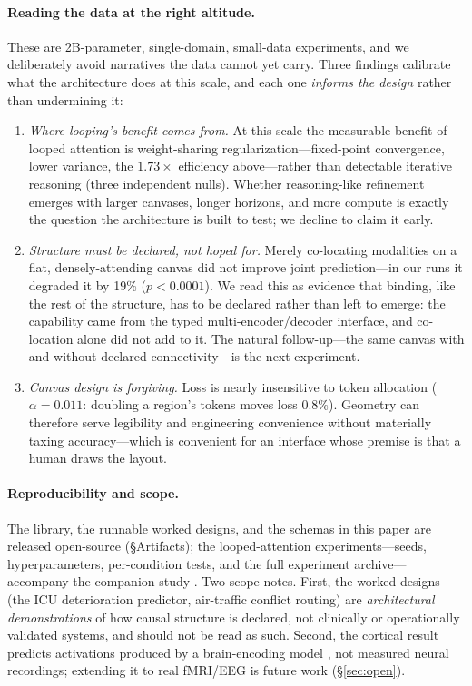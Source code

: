 \documentclass[10pt,twocolumn]{article}
\begin{document}
\paragraph{Reading the data at the right altitude.} These are 2B-parameter, single-domain, small-data experiments, and we deliberately avoid narratives the data cannot yet carry. Three findings calibrate what the architecture does at this scale, and each one \emph{informs the design} rather than undermining it:
\begin{enumerate}[leftmargin=1.2em,itemsep=1pt,topsep=2pt]
\item \emph{Where looping's benefit comes from.} At this scale the measurable benefit of looped attention is weight-sharing regularization---fixed-point convergence, lower variance, the $1.73\times$ efficiency above---rather than detectable iterative reasoning (three independent nulls). Whether reasoning-like refinement emerges with larger canvases, longer horizons, and more compute is exactly the question the architecture is built to test; we decline to claim it early.
\item \emph{Structure must be declared, not hoped for.} Merely co-locating modalities on a flat, densely-attending canvas did not improve joint prediction---in our runs it degraded it by 19\% ($p<0.0001$). We read this as evidence that binding, like the rest of the structure, has to be declared rather than left to emerge: the capability came from the typed multi-encoder/decoder interface, and co-location alone did not add to it. The natural follow-up---the same canvas with and without declared connectivity---is the next experiment.
\item \emph{Canvas design is forgiving.} Loss is nearly insensitive to token allocation ($\alpha=0.011$: doubling a region's tokens moves loss $0.8\%$). Geometry can therefore serve legibility and engineering convenience without materially taxing accuracy---which is convenient for an interface whose premise is that a human draws the layout.
\end{enumerate}

\paragraph{Reproducibility and scope.} The library, the runnable worked designs, and the schemas in this paper are released open-source (\S Artifacts); the looped-attention experiments---seeds, hyperparameters, per-condition tests, and the full experiment archive---accompany the companion study \cite{valdez2026looped}. Two scope notes. First, the worked designs (the ICU deterioration predictor, air-traffic conflict routing) are \emph{architectural demonstrations} of how causal structure is declared, not clinically or operationally validated systems, and should not be read as such. Second, the cortical result predicts activations produced by a brain-encoding model \cite{tribev2}, not measured neural recordings; extending it to real fMRI/EEG is future work (\S\ref{sec:open}).
\end{document}
